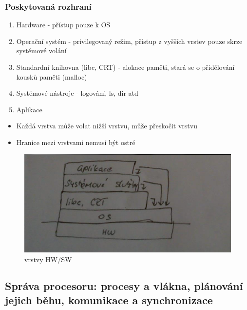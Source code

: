 \documentclass[10pt,a4paper]{article}
\begin{document}
\subsubsection{Poskytovaná rozhraní}
\begin{enumerate}
	\item Hardware - přístup pouze k OS
	\item Operační systém - privilegovaný režim, přístup z vyšších vrstev pouze skrze systémové volání
	\item Standardní knihovna (libc, CRT) - alokace paměti, stará se o přidělování kousků paměti (malloc)
	\item Systémové nástroje - logování, ls, dir atd
	\item Aplikace
\end{enumerate}
\begin{itemize}
	\item Každá vrstva může volat nižší vrstvu, může přeskočit vrstvu
	\item Hranice mezi vrstvami nemusí být ostré
\end{itemize}

\begin{figure} [h]
		\includegraphics[scale=1]{img/vrstvy_HW-SW.png}
		\caption{vrstvy HW/SW}	
\end{figure}

\subsection{Správa procesoru: procesy a vlákna, plánování jejich běhu, komunikace a synchronizace}
\end{document}

